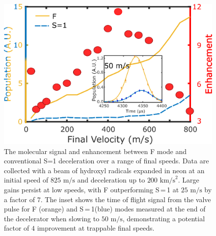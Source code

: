 \documentclass[%
 reprint,
 amsmath,amssymb,
 aps,
prl,
]{revtex4-1}
\begin{document}
\begin{figure}[t]
\includegraphics[width=\linewidth]{Figure3.png}%
\vspace{-5pt}
\caption{\label{fig:alldata}
The molecular signal and enhancement between F mode and conventional S=1 deceleration over a range of final speeds. 
Data are collected with a beam of hydroxyl radicals expanded in neon at an initial speed of $825 \text{ m/s}$ and deceleration up to $200 \text{ km/s}^2$. 
Large gains persist at low speeds, with F outperforming S\,=\,1 at $25 \text{ m/s}$ by a factor of $7$. 
The inset shows the time of flight signal from the valve pulse for F (orange) and S\,=\,1(blue) modes measured at the end of the decelerator when slowing to $50 \text{ m/s}$, demonstrating a potential factor of $4$ improvement at trappable final speeds. 
\vspace{-4mm}}
\end{figure}
\end{document}
